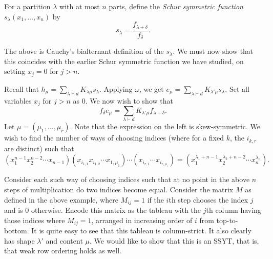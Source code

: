 	\begin{fdef}
		For a partition $\lambda$ with at most $n$ parts, define the \emph{Schur symmetric function} $s_\lambda(x_1,\ldots,x_n)$ by
		\[ s_\lambda = \frac{f_{\lambda+\delta}}{f_\delta}. \]
	\end{fdef}
	The above is Cauchy's bialternant definition of the $s_\lambda$. We must now show that this coincides with the earlier Schur symmetric function we have studied, on setting $x_j = 0$ for $j > n$.

	Recall that $h_\mu = \sum_{\lambda \vdash d} K_{\lambda\mu} s_\lambda$. Applying $\omega$, we get $e_\mu = \sum_{\lambda \vdash d} K_{\lambda'\mu} s_\lambda$. Set all variables $x_j$ for $j > n$ as $0$. We now wish to show that
	\[ f_\delta e_\mu = \sum_{\lambda \vdash d} K_{\lambda'\mu} f_{\lambda+\delta}. \]
	Let $\mu = (\mu_1,\ldots,\mu_r)$. Note that the expression on the left is skew-symmetric. We wish to find the number of ways of choosing indices (where for a fixed $k$, the $i_{k,r}$ are distinct) such that
	\[ (x_1^{n-1} x_2^{n-2} \cdots x_{n-1})(x_{i_{1,1}}x_{i_{1,2}}\cdots x_{1,\mu_1})\cdots(x_{i_{r,1}}\cdots x_{i_{r,\mu_r}}) = ( x_1^{\lambda_1 + n-1} x_2^{\lambda_2 + n-2} \cdots x_n^{\lambda_n} ). \]

	Consider each such way of choosing indices such that at no point in the above $n$ steps of multiplication do two indices become equal. Consider the matrix $M$ as defined in the above example, where $M_{ij} = 1$ if the $i$th step chooses the index $j$ and is $0$ otherwise. Encode this matrix as the tableau with the $j$th column having those indices where $M_{ij} = 1$, arranged in increasing order of $i$ from top-to-bottom. It is quite easy to see that this tableau is column-strict. It also clearly has shape $\lambda'$ and content $\mu$. We would like to show that this is an SSYT, that is, that weak row ordering holds as well.

